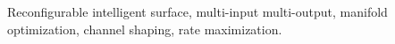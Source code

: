 \documentclass[journal]{IEEEtran}
\begin{document}
\begin{abstract}


\end{abstract}

\begin{IEEEkeywords}
	Reconfigurable intelligent surface, multi-input multi-output, manifold optimization, channel shaping, rate maximization.
\end{IEEEkeywords}

\glsresetall
\end{document}
